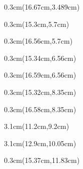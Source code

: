 \documentclass[a4paper]{article}
\begin{document}
\begin{Form}
\begin{textblock*}{0.3cm}(16.67cm,3.489cm) %
\noindent
\end{textblock*}

\begin{textblock*}{0.3cm}(15.3cm,5.7cm) %
\noindent
\end{textblock*}

\begin{textblock*}{0.3cm}(16.56cm,5.7cm) %
\noindent
\end{textblock*}

\begin{textblock*}{0.3cm}(15.34cm,6.56cm) %
\noindent
\end{textblock*}

\begin{textblock*}{0.3cm}(16.59cm,6.56cm) %
\noindent
\end{textblock*}

\begin{textblock*}{0.3cm}(15.32cm,8.35cm) %
\noindent
\end{textblock*}

\begin{textblock*}{0.3cm}(16.58cm,8.35cm) %
\noindent
\end{textblock*}

\begin{textblock*}{3.1cm}(11.2cm,9.2cm) %
\noindent
\Gruendungsjahr
\end{textblock*}

\begin{textblock*}{3.1cm}(12.9cm,10.05cm) %
\noindent
\AnzahlAN
\end{textblock*}

\begin{textblock*}{0.3cm}(15.37cm,11.83cm) %
\noindent
\end{textblock*}


\end{Form}
\end{document}
